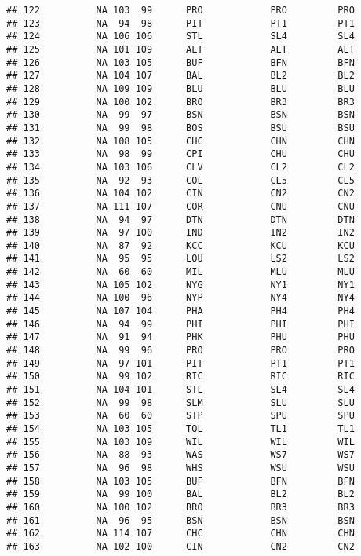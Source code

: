 \documentclass[]{article}
\begin{document}
\begin{verbatim}
## 122          NA 103  99      PRO            PRO         PRO
## 123          NA  94  98      PIT            PT1         PT1
## 124          NA 106 106      STL            SL4         SL4
## 125          NA 101 109      ALT            ALT         ALT
## 126          NA 103 105      BUF            BFN         BFN
## 127          NA 104 107      BAL            BL2         BL2
## 128          NA 109 109      BLU            BLU         BLU
## 129          NA 100 102      BRO            BR3         BR3
## 130          NA  99  97      BSN            BSN         BSN
## 131          NA  99  98      BOS            BSU         BSU
## 132          NA 108 105      CHC            CHN         CHN
## 133          NA  98  99      CPI            CHU         CHU
## 134          NA 103 106      CLV            CL2         CL2
## 135          NA  92  93      COL            CL5         CL5
## 136          NA 104 102      CIN            CN2         CN2
## 137          NA 111 107      COR            CNU         CNU
## 138          NA  94  97      DTN            DTN         DTN
## 139          NA  97 100      IND            IN2         IN2
## 140          NA  87  92      KCC            KCU         KCU
## 141          NA  95  95      LOU            LS2         LS2
## 142          NA  60  60      MIL            MLU         MLU
## 143          NA 105 102      NYG            NY1         NY1
## 144          NA 100  96      NYP            NY4         NY4
## 145          NA 107 104      PHA            PH4         PH4
## 146          NA  94  99      PHI            PHI         PHI
## 147          NA  91  94      PHK            PHU         PHU
## 148          NA  99  96      PRO            PRO         PRO
## 149          NA  97 101      PIT            PT1         PT1
## 150          NA  99 102      RIC            RIC         RIC
## 151          NA 104 101      STL            SL4         SL4
## 152          NA  99  98      SLM            SLU         SLU
## 153          NA  60  60      STP            SPU         SPU
## 154          NA 103 105      TOL            TL1         TL1
## 155          NA 103 109      WIL            WIL         WIL
## 156          NA  88  93      WAS            WS7         WS7
## 157          NA  96  98      WHS            WSU         WSU
## 158          NA 103 105      BUF            BFN         BFN
## 159          NA  99 100      BAL            BL2         BL2
## 160          NA 100 102      BRO            BR3         BR3
## 161          NA  96  95      BSN            BSN         BSN
## 162          NA 114 107      CHC            CHN         CHN
## 163          NA 102 100      CIN            CN2         CN2

\end{verbatim}
\end{document}
